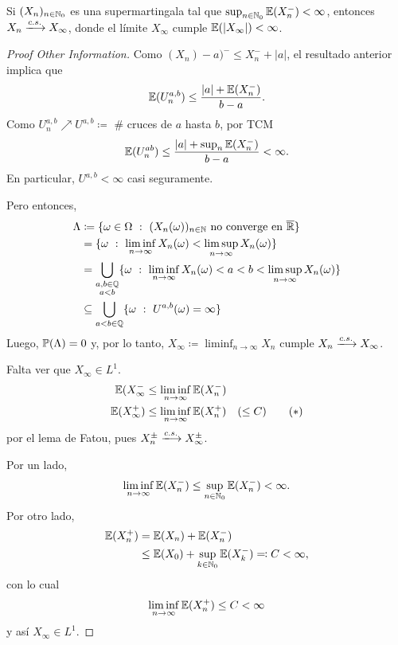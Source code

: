 \begin{theorem}
	Si $(X_{n})_{n \in \mathbb{N}_{0}}$ es una supermartingala tal que $\sup_{n \in \mathbb{N}_{0}} \mathbb{E}(X_{n}^{-}) < \infty$, entonces $X_{n} \xlongrightarrow{c.s.} X_{\infty}$, donde el límite $X_{\infty}$ cumple $\mathbb{E}(|X_{\infty}|) < \infty$.
\end{theorem}
\begin{proof}[Proof Other Information]
	Como $(X_{n}) - a)^{-} \leq X_{n}^{-} + |a|$, el resultado anterior implica que
	\[ \mathbb{E}(U_{n}^{a,b}) \leq \frac{|a| + \mathbb{E}(X_{n}^{-})}{b - a}. \]
	Como $U_{n}^{a,b} \nearrow U^{a,b} \coloneq$ \# cruces de $a$ hasta $b$, por TCM 
	\[ \mathbb{E}(U_{n}^{ab}) \leq \frac{|a| + \sup_{n} \mathbb{E}(X_{n}^{-})}{b - a} < \infty. \]
	En particular, $U^{a,b} < \infty$ casi seguramente. \par
	Pero entonces,
	\begin{align*}
		\Lambda &\coloneq \{ \omega \in \Omega \ : \ (X_{n}(\omega))_{n \in \N} \text{ no converge en } \overline{\R} \} \\ 
		&= \{ \omega \ : \ \liminf_{n \to \infty} X_{n}(\omega) < \limsup_{n \to \infty} X_{n}(\omega) \} \\
		&= \bigcup_{\substack{a,b \in \Q \\ a < b}} \{ \omega \ : \ \liminf_{n \to \infty} X_{n}(\omega) < a < b < \limsup_{n \to \infty} X_{n}(\omega) \} \\
		&\subseteq \bigcup_{a < b \in \Q} \{ \omega \ : \ U^{a,b}(\omega) = \infty \}
	\end{align*}
	Luego, $\mathbb{P}(\Lambda) = 0$ y, por lo tanto, $X_{\infty} \coloneq \liminf_{n \to \infty} X_{n}$ cumple $X_{n} \xlongrightarrow{c.s.} X_{\infty}$. \par
	Falta ver que $X_{\infty} \in L^{1}$.
	\begin{align*}
		\mathbb{E}(X_{\infty}^{-} &\leq \liminf_{n \to \infty} \mathbb{E}(X_{n}^{-}) \\
		\mathbb{E}(X_{\infty}^{+}) &\leq \liminf_{n \to \infty} \mathbb{E}(X_{n}^{+}) \quad (\leq C) \tag{$*$}
	\end{align*}
	por el lema de Fatou, pues $X_{n}^{\pm} \xlongrightarrow{c.s.} X_{\infty}^{\pm}$. \par
	Por un lado,
	\[ \liminf_{n \to \infty} \mathbb{E}(X_{n}^{-}) \leq \sup_{n \in \mathbb{N}_{0}} \mathbb{E}(X_{n}^{-}) < \infty. \]
	Por otro lado,
	\begin{align*}
		\mathbb{E}(X_{n}^{+}) &= \mathbb{E}(X_{n}) + \mathbb{E}(X_{n}^{-}) \\
		&\leq \mathbb{E}(X_{0}) + \sup_{k \in \mathbb{N}_{0}} \mathbb{E}(X_{k}^{-}) \eqcolon C < \infty,
	\end{align*}
	con lo cual
	\[ \liminf_{n \to \infty} \mathbb{E}(X_{n}^{+}) \leq C < \infty \]
	y así $X_{\infty} \in L^{1}$.
\end{proof}

